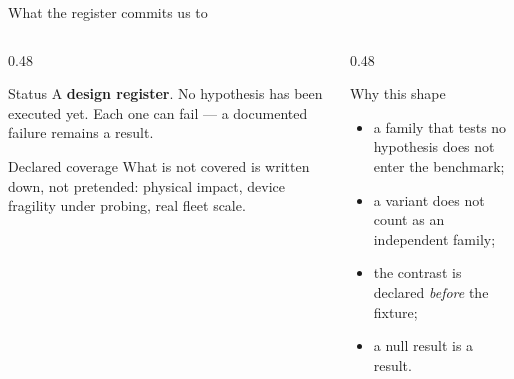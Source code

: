 \documentclass[aspectratio=169,10pt]{beamer}
\begin{document}
\begin{frame}{What the register commits us to}

  \begin{columns}[T,onlytextwidth]
    \begin{column}{0.48\textwidth}
      \begin{block}{Status}
        \small A \textbf{design register}. No hypothesis has been executed yet.
        Each one can fail --- a documented failure remains a result.
      \end{block}
      \begin{exampleblock}{Declared coverage}
        \small What is not covered is written down, not pretended: physical
        impact, device fragility under probing, real fleet scale.
      \end{exampleblock}
    \end{column}
    \begin{column}{0.48\textwidth}
      \begin{alertblock}{Why this shape}
        \small
        \begin{itemize}
          \item a family that tests no hypothesis does not enter the benchmark;
          \item a variant does not count as an independent family;
          \item the contrast is declared \emph{before} the fixture;
          \item a null result is a result.
        \end{itemize}
      \end{alertblock}
    \end{column}
  \end{columns}

\end{frame}
\end{document}
